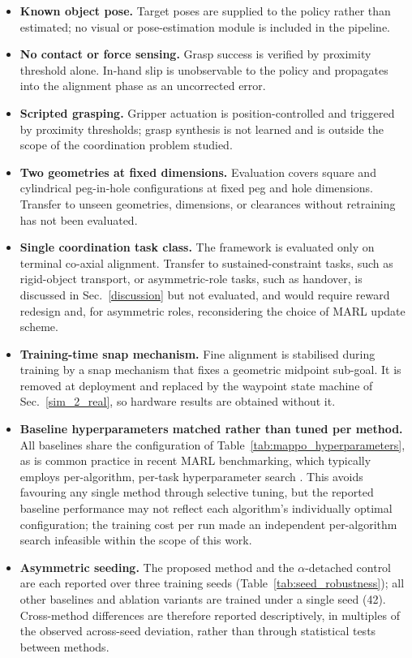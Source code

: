 \documentclass[a4paper,fleqn]{cas-dc}
\begin{document}
\begin{itemize}
\item \textbf{Known object pose.} Target poses are supplied to the policy rather than estimated; no visual or pose-estimation module is included in the pipeline.
\item \textbf{No contact or force sensing.} Grasp success is verified by proximity threshold alone. In-hand slip is unobservable to the policy and propagates into the alignment phase as an uncorrected error.
\item \textbf{Scripted grasping.} Gripper actuation is position-controlled and triggered by proximity thresholds; grasp synthesis is not learned and is outside the scope of the coordination problem studied.
\item \textbf{Two geometries at fixed dimensions.} Evaluation covers square and cylindrical peg-in-hole configurations at fixed peg and hole dimensions. Transfer to unseen geometries, dimensions, or clearances without retraining has not been evaluated.
\item \textbf{Single coordination task class.} The framework is evaluated only on terminal co-axial alignment. Transfer to sustained-constraint tasks, such as rigid-object transport, or asymmetric-role tasks, such as handover, is discussed in Sec.~\ref{discussion} but not evaluated, and would require reward redesign and, for asymmetric roles, reconsidering the choice of MARL update scheme.
\item \textbf{Training-time snap mechanism.} Fine alignment is stabilised during training by a snap mechanism that fixes a geometric midpoint sub-goal. It is removed at deployment and replaced by the waypoint state machine of Sec.~\ref{sim_2_real}, so hardware results are obtained without it.
\item \textbf{Baseline hyperparameters matched rather than tuned per method.} All baselines share the configuration of Table~\ref{tab:mappo_hyperparameters}, as is common practice in recent MARL benchmarking, which typically employs per-algorithm, per-task hyperparameter search \cite{xie2026multi}. This avoids favouring any single method through selective tuning, but the reported baseline performance may not reflect each algorithm's individually optimal configuration; the training cost per run made an independent per-algorithm search infeasible within the scope of this work.
\item \textbf{Asymmetric seeding.} The proposed method and the $\alpha$-detached control are each reported over three training seeds (Table~\ref{tab:seed_robustness}); all other baselines and ablation variants are trained under a single seed (42). Cross-method differences are therefore reported descriptively, in multiples of the observed across-seed deviation, rather than through statistical tests between methods.

\end{itemize}
\end{document}
